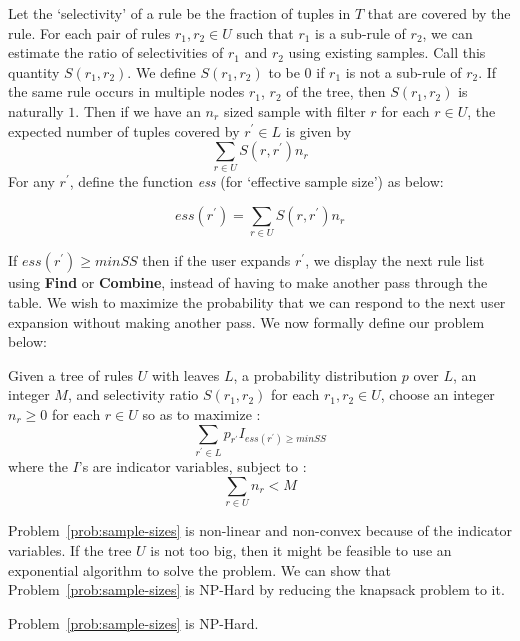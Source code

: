Let the `selectivity' of a rule be the fraction of tuples in $T$ that are covered by the rule. For each pair of rules $r_1, r_2 \in U$ such that $r_1$ is a sub-rule of $r_2$, we can estimate the ratio of selectivities of $r_1$ and $r_2$ using existing samples. Call this quantity $S(r_1, r_2)$. We define $S(r_1, r_2)$ to be $0$ if $r_1$ is not a sub-rule of $r_2$. If the same rule occurs in multiple nodes $r_1$, $r_2$ of the tree, then $S(r_1, r_2)$ is naturally $1$. Then if we have an $n_r$ sized sample with filter $r$ for each $r \in U$, the expected number of tuples covered by $r^{\prime} \in L$ is given by $$\sum_{r \in U} S(r, r^{\prime})n_r$$ For any $r^{\prime}$, define the function {\em ess} (for `effective sample size') as below: 
\begin{definition}\label{def:ess}
$$ess(r^{\prime}) = \sum_{r \in U} S(r, r^{\prime})n_r$$ 
\end{definition}
If $ess(r^{\prime}) \geq minSS$ then if the user expands $r^{\prime}$, we display the next rule list using \textbf{Find} or \textbf{Combine}, instead of having to make another pass through the table. We wish to maximize the probability that we can respond to the next user expansion without making another pass. We now formally define our problem below:
\begin{problem}\label{prob:sample-sizes}
Given a tree of rules $U$ with leaves $L$, a probability distribution $p$ over $L$, an integer $M$, and selectivity ratio $S(r_1, r_2)$ for each $r_1, r_2 \in U$, 
choose an integer $n_r \geq 0$ for each $r \in U$ so as to $\textrm{maximize}$ :
$$\sum_{r^{\prime} \in L} p_{r^{\prime}}I_{ess(r^{\prime}) \geq minSS}$$
where the $I$'s are indicator variables, subject to :
$$\sum_{r \in U} n_r < M$$
\end{problem}
Problem~\ref{prob:sample-sizes} is non-linear and non-convex because of the indicator variables. If the tree $U$ is not too big, then it might be feasible to use an exponential algorithm to solve the problem. We can show that Problem~\ref{prob:sample-sizes} is NP-Hard by reducing the knapsack problem to it. 
\begin{lemma}
Problem~\ref{prob:sample-sizes} is NP-Hard.
\end{lemma}
